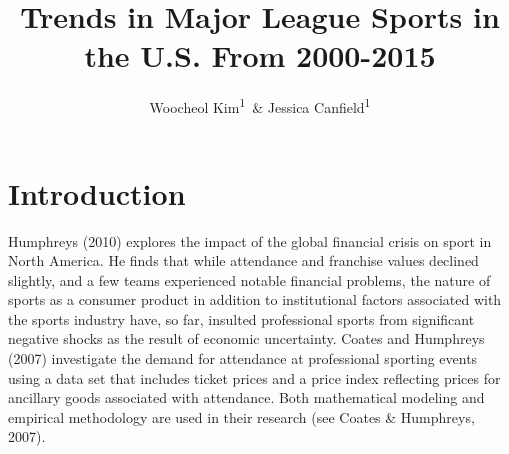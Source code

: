 \documentclass[man, fleqn, noextraspace,floatsintext]{apa6}
\title{Trends in Major League Sports in the U.S. From 2000-2015}
\author{Woocheol Kim\textsuperscript{1}~\& Jessica Canfield\textsuperscript{1}}
\date{}
\affiliation{
\vspace{0.5cm}
\textsuperscript{1} University of Oregon}
\begin{document}
\maketitle

\section{Introduction}\label{introduction}

Humphreys (2010) explores the impact of the global financial crisis on
sport in North America. He finds that while attendance and franchise
values declined slightly, and a few teams experienced notable financial
problems, the nature of sports as a consumer product in addition to
institutional factors associated with the sports industry have, so far,
insulted professional sports from significant negative shocks as the
result of economic uncertainty. Coates and Humphreys (2007) investigate
the demand for attendance at professional sporting events using a data
set that includes ticket prices and a price index reflecting prices for
ancillary goods associated with attendance. Both mathematical modeling
and empirical methodology are used in their research (see Coates \&
Humphreys, 2007).
\end{document}
